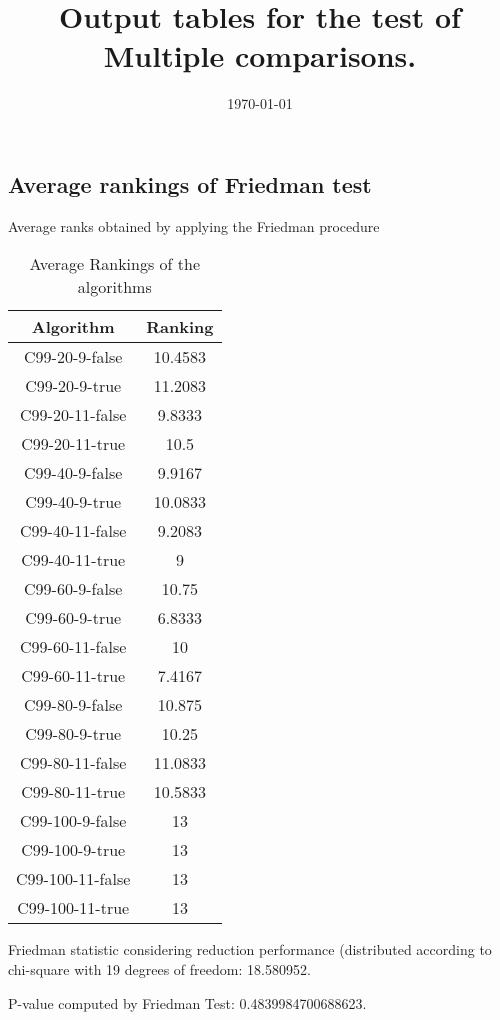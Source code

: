 \documentclass[a4paper,10pt]{article}
\title{Output tables for the test of Multiple comparisons.}
\author{}
\date{\today}
\begin{document}
\begin{landscape}
\pagestyle{empty}
\maketitle
\thispagestyle{empty}
\section{Average rankings of Friedman test}



Average ranks obtained by applying the Friedman procedure

\begin{table}[!htp]
\centering
\begin{tabular}{|c|c|}\hline
Algorithm&Ranking\\\hline
C99-20-9-false & 10.4583\\
C99-20-9-true & 11.2083\\
C99-20-11-false & 9.8333\\
C99-20-11-true & 10.5\\
C99-40-9-false & 9.9167\\
C99-40-9-true & 10.0833\\
C99-40-11-false & 9.2083\\
C99-40-11-true & 9\\
C99-60-9-false & 10.75\\
C99-60-9-true & 6.8333\\
C99-60-11-false & 10\\
C99-60-11-true & 7.4167\\
C99-80-9-false & 10.875\\
C99-80-9-true & 10.25\\
C99-80-11-false & 11.0833\\
C99-80-11-true & 10.5833\\
C99-100-9-false & 13\\
C99-100-9-true & 13\\
C99-100-11-false & 13\\
C99-100-11-true & 13\\
\hline
\end{tabular}
\caption{Average Rankings of the algorithms}
\end{table}

Friedman statistic considering reduction performance (distributed according to chi-square with 19 degrees of freedom: 18.580952.

P-value computed by Friedman Test: 0.4839984700688623.\newline




\end{landscape}
\end{document}
